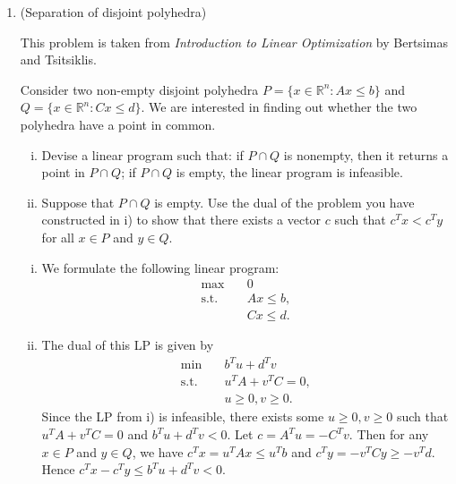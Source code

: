 \documentclass[11pt]{article}
\renewcommand{\leq}{\leqslant}
\renewcommand{\geq}{\geqslant}
\begin{document}
\begin{enumerate}[1)]
Formulate this learning problem as a linear program.

\begin{solution}
	\begin{align*}
      \max & \quad \lambda \\
      \text{s.t.} 
      & \quad y_i(a^T v_i - b) \geq \lambda, \quad i = 1, \ldots, m, \\
      & \quad a_j \leq c_j, \quad j = 1, \ldots, n, \\
      & \quad a_j \geq -c_j, \quad j = 1, \ldots, n, \\
      & \quad \sum_{j=1}^n c_j = 1. \\
    \end{align*}
\end{solution}

\item (Separation of disjoint polyhedra) 

This problem is taken from \emph{Introduction to Linear Optimization} by Bertsimas and Tsitsiklis.

Consider two non-empty disjoint polyhedra $P=\{x \in \mathbb{R}^n : Ax \leq b\}$ and $Q=\{x \in \mathbb{R}^n : Cx \leq d\}$. We are interested in finding out whether the two polyhedra have a point in common.
\begin{enumerate}[i)]
\item Devise a linear program such that: if $P\cap Q$ is nonempty, then it returns a point in $P\cap Q$; if $P\cap Q$ is empty, the linear program is infeasible.
\item Suppose that $P\cap Q$ is empty. Use the dual of the problem you have constructed in i) to show that there exists a vector $c$ such that $c^Tx < c^Ty$ for all $x \in P$ and $y \in Q$.
\end{enumerate}

\begin{solution}
  \begin{enumerate}[i)]
    \item We formulate the following linear program:
    \begin{align*}
      \max & \quad 0 \\
      \text{s.t.}
      & \quad Ax \leq b, \\
      & \quad Cx \leq d.
    \end{align*}

    \item The dual of this LP is given by
    \begin{align*}
      \min & \quad b^T u + d^T v \\
      \text{s.t.}
      & \quad u^T A + v^T C = 0, \\
      & \quad u \geq 0, v \geq 0.
    \end{align*}
    Since the LP from i) is infeasible, there exists some $u \geq 0, v \geq 0$ such that $u^T A + v^T C = 0$ and $b^T u + d^T v < 0$. 
    Let $c = A^T u = -C^T v$. Then for any $x \in P$ and $y \in Q$, we have $c^T x = u^T A x \leq u^T b$ and $c^T y = -v^T C y \geq -v^T d$. 
    Hence $c^T x - c^T y \leq b^T u + d^T v < 0$.
  \end{enumerate}
\end{solution}


\end{enumerate}
\end{document}
